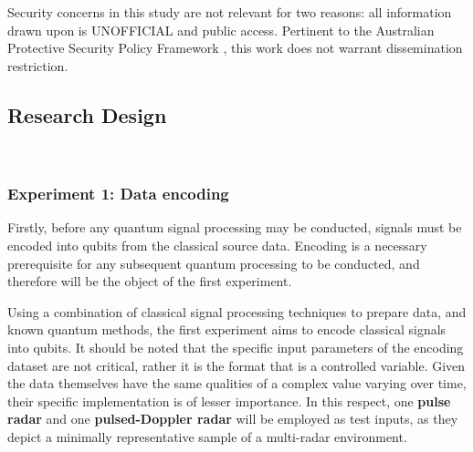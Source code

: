 Security concerns in this study are not relevant for two reasons: all information drawn upon is UNOFFICIAL and public access.
Pertinent to the Australian Protective Security Policy Framework \cite{noauthor_protective_nodate}, this work does not warrant dissemination restriction.

\subsection{Research Design}~\label{sec:research_design}

\subsubsection{Experiment 1: Data encoding}
Firstly, before any quantum signal processing may be conducted, signals must be encoded into qubits from the classical source data.
Encoding is a necessary prerequisite for any subsequent quantum processing to be conducted, and therefore will be the object of the first experiment.

Using a combination of classical signal processing techniques to prepare data, and known quantum methods, the first experiment aims to encode classical signals into qubits.
It should be noted that the specific input parameters of the encoding dataset are not critical, rather it is the format that is a controlled variable.
Given the data themselves have the same qualities of a complex value varying over time, their specific implementation is of lesser importance.
In this respect, one \textbf{pulse radar} and one \textbf{pulsed-Doppler radar} will be employed as test inputs, as they depict a minimally representative sample of a multi-radar environment. 

